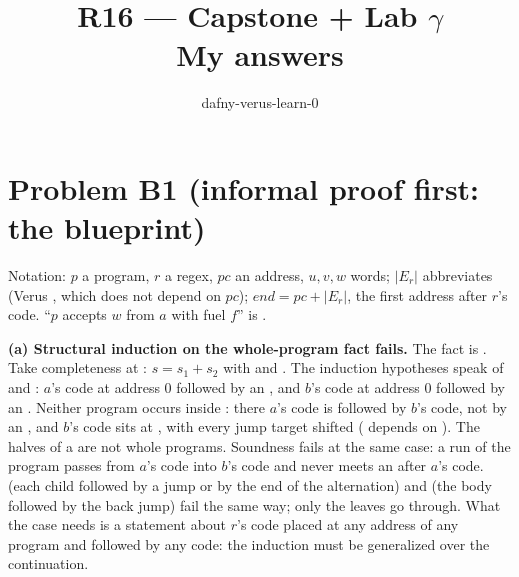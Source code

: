 \documentclass[11pt]{article}
\title{R16 --- Capstone + Lab $\gamma$ \\ \large My answers}
\author{dafny-verus-learn-0}
\date{}
\begin{document}
\maketitle
\sloppy
\section*{Problem B1 (informal proof first: the blueprint)}\label{ans:B1}
\begin{answer}
Notation: $p$ a program, $r$ a regex, $pc$ an address, $u, v, w$ words;
$|E_r|$ abbreviates  (Verus , which does not
depend on $pc$); $\mathit{end} = pc + |E_r|$, the first address after $r$'s
code. ``$p$ accepts $w$ from $a$ with fuel $f$'' is .

\textbf{(a) Structural induction on the whole-program fact fails.} The fact is
. Take completeness at
: $s = s_1 + s_2$ with  and
. The induction hypotheses speak of  and
: $a$'s code at address 0 followed by an , and
$b$'s code at address 0 followed by an . Neither program occurs
inside : there $a$'s code is followed by $b$'s code,
not by an , and $b$'s code sits at , with every
jump target shifted ( depends on ). The halves of a
 are not whole programs. Soundness fails at the same case: a run of
the  program passes from $a$'s code into $b$'s code and never meets an
 after $a$'s code.  (each child followed by a jump or by
the end of the alternation) and  (the body followed by the back
jump) fail the same way; only the leaves go through. What the case needs is a
statement about $r$'s code placed at any address of any program and followed
by any code: the induction must be generalized over the continuation.


\end{answer}
\end{document}
